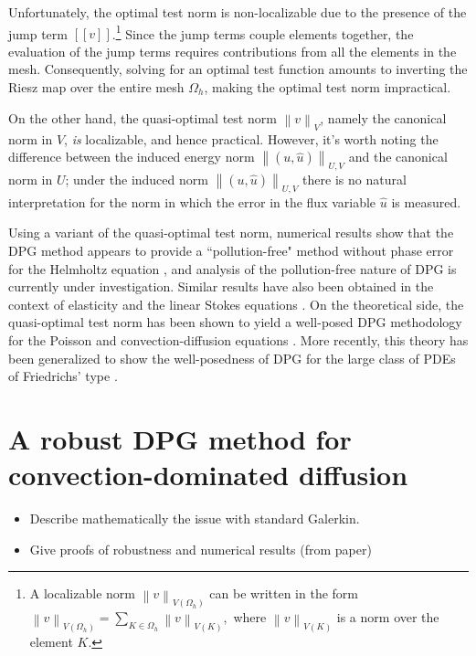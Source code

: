 \documentclass{report}
\newcommand{\eqnref}[1]{\eqref{eq:#1}}
\newcommand{\nor}[1]{\left\| #1 \right\|}
\newcommand{\LRp}[1]{\left( #1 \right)}
\newcommand{\LRs}[1]{\left[ #1 \right]}
\newcommand{\jump}[1] {\ensuremath{\LRs{\![#1]\!}}}
\newcommand{\uh}{\widehat{u}}
\newcommand{\Oh}{\Omega_h}
\begin{document}
Unfortunately, the optimal test norm is non-localizable due to the presence of the jump term $\jump{v}$.\footnote{A localizable norm $\nor{v}_{V(\Oh)}$ can be written in the form $\nor{v}_{V(\Oh)} = \sum_{K\in\Oh} \nor{v}_{V(K)},$ where $\nor{v}_{V(K)}$ is a norm over the element $K$.} Since the jump terms couple elements together, the evaluation of the jump terms requires contributions from all the elements in the mesh. Consequently, solving for an optimal test function
amounts to inverting the Riesz map %
over the entire mesh $\Oh$, making the optimal test norm impractical.

On the other hand, the quasi-optimal test norm $\nor{v}_V$, namely the canonical norm in $V$, \textit{is} localizable, and hence practical. However, it's worth noting the difference between the induced energy norm $\nor{\LRp{u,\uh}}_{U,V}$ and the canonical norm in $U$; under the induced norm $\nor{\LRp{u,\uh}}_{U,V}$ there is no natural interpretation for the norm in which the error in the flux variable $\uh$ is measured. 

Using a variant of the quasi-optimal test norm, numerical results show that the DPG method appears to provide a ``pollution-free" method without phase error for the Helmholtz equation \cite{DPG4}, and analysis of the pollution-free nature of DPG is currently under investigation. Similar results have also been obtained in the context of elasticity \cite{DPGElas} and the linear Stokes equations \cite{Camellia}. On the theoretical side, the quasi-optimal test norm has been shown to yield a well-posed DPG methodology for the Poisson and convection-diffusion equations \cite{analysisDPG}. More recently, this theory has been generalized to show the well-posedness of DPG for the large class of PDEs of Friedrichs' type \cite{Bui-ThanhDemkowiczGhattas11b}.  

\chapter{A robust DPG method for convection-dominated diffusion}

\begin{itemize}
\item Describe mathematically the issue with standard Galerkin.
\item Give proofs of robustness and numerical results (from paper)\cite{ChanHeuerBui-ThanhDemkowicz12}
\end{itemize}
\end{document}
